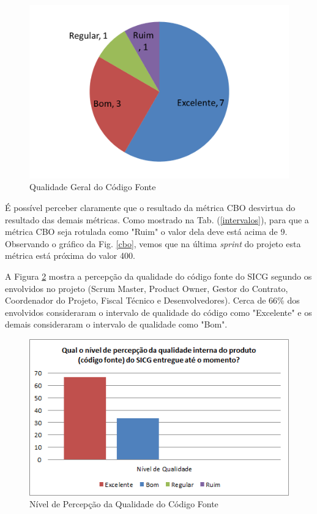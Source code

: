 \begin{figure}[H]
		\centering
			\includegraphics[scale=1.0]{figuras/pizzatotal.png}
		\caption{Qualidade Geral do Código Fonte}
		\label{pizzatotal}
\end{figure}


É possível perceber claramente que o resultado da métrica CBO desvirtua do resultado das demais métricas. Como mostrado na Tab. (\ref{intervalos}), para que a métrica CBO seja rotulada como "Ruim" o valor dela deve está acima de 9. Observando o gráfico da Fig. \ref{cbo}, vemos que na última \textit{sprint} do projeto esta métrica está próxima do valor 400.

A Figura \ref{percepcaoqualidade} mostra a percepção da qualidade do código fonte do SICG segundo os envolvidos no projeto (Scrum Master, Product Owner, Gestor do Contrato, Coordenador do Projeto, Fiscal Técnico e Desenvolvedores). Cerca de 66\% dos envolvidos consideraram  o intervalo de qualidade do código como "Excelente" e os demais consideraram
o intervalo de qualidade como "Bom".

\begin{figure}[H]
		\centering
			\includegraphics[scale=1.0]{figuras/percepcaoqualidade.png}
		\caption{Nível de Percepção da Qualidade do Código Fonte}
		\label{percepcaoqualidade}
\end{figure}

